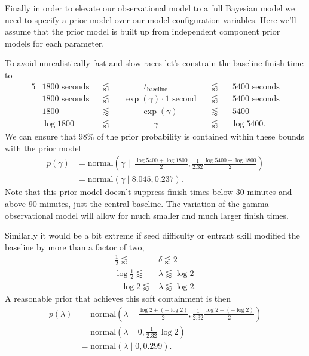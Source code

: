 \documentclass[
  letterpaper,
  DIV=11,
  numbers=noendperiod]{scrartcl}
\begin{document}
Finally in order to elevate our observational model to a full Bayesian
model we need to specify a prior model over our model configuration
variables. Here we'll assume that the prior model is built up from
independent component prior models for each parameter.

To avoid unrealistically fast and slow races let's constrain the
baseline finish time to \begin{alignat*}{5}
& 1800 \text{ seconds} &
& \lessapprox &
& \quad\quad\;\; t_{\mathrm{baseline}} &
& \lessapprox &
& \, 5400 \text{ seconds}
\\
& 1800 \text{ seconds} &
& \lessapprox &
& \, \exp(\gamma) \cdot 1 \text{ second} \, &
& \lessapprox &
& \, 5400 \text{ seconds}
\\
& 1800 &
& \lessapprox &
& \quad\quad\; \exp(\gamma) &
& \lessapprox &
& \, 5400
\\
& \log 1800 &
& \lessapprox &
& \quad\quad\quad\;\;\, \gamma &
& \lessapprox &
& \log 5400.
\end{alignat*} We can ensure that 98\% of the prior probability is
contained within these bounds with the prior model \begin{align*}
p( \gamma )
&=
\text{normal} \left(
\gamma \;\, \bigg| \;\, \frac{\log 5400 + \log 1800}{2},
                        \frac{1}{2.32} \frac{\log 5400 - \log 1800}{2} \right)
\\
&= \text{normal}( \gamma \mid 8.045, 0.237).
\end{align*} Note that this prior model doesn't suppress finish times
below 30 minutes and above 90 minutes, just the central baseline. The
variation of the gamma observational model will allow for much smaller
and much larger finish times.

Similarly it would be a bit extreme if seed difficulty or entrant skill
modified the baseline by more than a factor of two, \begin{align*}
\frac{1}{2} \lessapprox &\delta \lessapprox 2
\\
\log \frac{1}{2} \lessapprox &\lambda \lessapprox \log 2
\\
- \log 2 \lessapprox &\lambda \lessapprox \log 2.
\end{align*} A reasonable prior that achieves this soft containment is
then \begin{align*}
p( \lambda )
&=
\text{normal} \left(
\lambda \;\, \bigg| \;\, \frac{\log 2 + (-\log 2)}{2},
                         \frac{1}{2.32} \frac{\log 2 - (-\log 2)}{2} \right)
\\
&=
\text{normal} \left(
\lambda \;\, \bigg| \;\, 0, \frac{1}{2.32} \, \log 2\right)
\\
&= \text{normal}( \lambda \mid 0, 0.299).
\end{align*}
\end{document}
